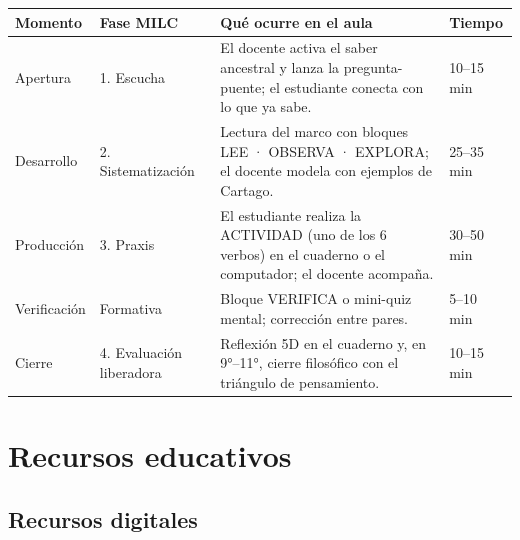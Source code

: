 \documentclass[12pt, a4paper]{article}
\begin{document}
\begin{center}
\setlength{\tabcolsep}{4pt}
\begin{tabular}{|L{2.1cm}|L{3.2cm}|L{6cm}|L{1.9cm}|}
\hline
{}
\color{white}\textbf{Momento} &
\color{white}\textbf{Fase MILC} &
\color{white}\textbf{Qué ocurre en el aula} &
\color{white}\textbf{Tiempo} \\
\hline
Apertura & 1. Escucha & El docente activa el saber ancestral y lanza la pregunta-puente; el estudiante conecta con lo que ya sabe. & 10–15 min \\
\hline
Desarrollo & 2. Sistematización & Lectura del marco con bloques LEE · OBSERVA · EXPLORA; el docente modela con ejemplos de Cartago. & 25–35 min \\
\hline
Producción & 3. Praxis & El estudiante realiza la ACTIVIDAD (uno de los 6 verbos) en el cuaderno o el computador; el docente acompaña. & 30–50 min \\
\hline
Verificación & Formativa & Bloque VERIFICA o mini-quiz mental; corrección entre pares. & 5–10 min \\
\hline
Cierre & 4. Evaluación liberadora & Reflexión 5D en el cuaderno y, en 9°–11°, cierre filosófico con el triángulo de pensamiento. & 10–15 min \\
\hline
\end{tabular}
\end{center}

\section{Recursos educativos}

\subsection{Recursos digitales}
\end{document}
